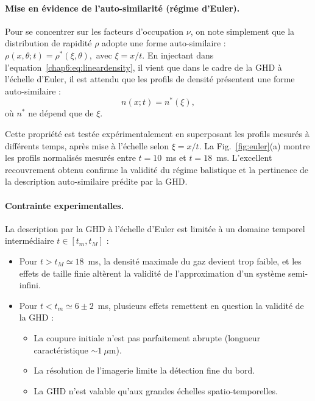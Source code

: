 \paragraph{Mise en évidence de l’auto-similarité (régime d’Euler).}
Pour se concentrer sur les facteurs d'occupation $\nu$, on note simplement que la distribution de rapidité $\rho$ adopte une forme auto-similaire :
\(
\rho(x,\theta;t) = \rho^\ast(\xi,\theta),
\)
avec $\xi = x/t$.
En injectant dans l'equation~\eqref{chap6:eq:lineardensity}, il vient que dans le cadre de la GHD à l’échelle d’Euler, il est attendu que les profils de densité présentent une forme auto-similaire :
\begin{equation}
	n(x;t) = n^\ast\left( \xi \right),
\end{equation}
où $n^\ast$ ne dépend que de $\xi$.

\medskip

Cette propriété est testée expérimentalement en superposant les profils mesurés à différents temps, après mise à l’échelle selon $\xi = x/t$. La Fig.~\ref{fig:euler}(a) montre les profils normalisés mesurés entre $t = 10$~ms et $t = 18$~ms. L’excellent recouvrement obtenu confirme la validité du régime balistique et la pertinence de la description auto-similaire prédite par la GHD.

\paragraph{Contrainte experimentalles.}

La description par la GHD à l’échelle d’Euler est limitée à un domaine temporel intermédiaire $t \in [t_m, t_M]$ :

\begin{itemize}[label = $\bullet$]
  \item Pour $t > t_M \simeq 18$~ms, la densité maximale du gaz devient trop faible, et les effets de taille finie altèrent la validité de l’approximation d’un système semi-infini.
  \item Pour $t < t_m \simeq 6 \pm 2$~ms, plusieurs effets remettent en question la validité de la GHD :
  \begin{itemize}[label = $\circ$]
    \item La coupure initiale n’est pas parfaitement abrupte (longueur caractéristique $\sim 1~\mu$m).
    \item La résolution de l’imagerie limite la détection fine du bord.
    \item La GHD n’est valable qu’aux grandes échelles spatio-temporelles.
  \end{itemize}
\end{itemize}

